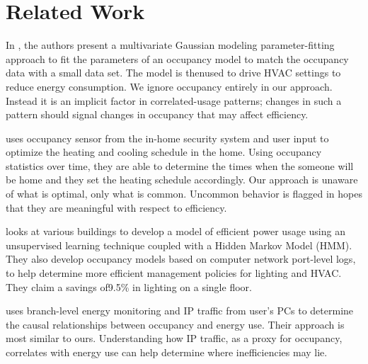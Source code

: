 \section{Related Work}

In \cite{occmodels_buildsys11}, the authors present a multivariate Gaussian modeling parameter-fitting 
approach to fit the parameters of an occupancy model to match the occupancy data with a small data set.  
The model is thenused to drive HVAC settings to reduce energy consumption.  We ignore occupancy entirely 
in our approach.  Instead it is an implicit factor in correlated-usage patterns; changes in such a pattern 
should signal changes in occupancy that may affect efficiency.

\cite{kaminthermo} uses occupancy sensor from the in-home security system and user input to
optimize the heating and cooling schedule in the home.  Using occupancy statistics over time, they
are able to determine the times when the someone will be home and they set the heating schedule accordingly.
Our approach is unaware of what is optimal, only what is common.  Uncommon behavior is flagged in hopes
that they are meaningful with respect to efficiency.

\cite{Bellala_buildsys11} looks at various buildings to develop a model of efficient power usage using 
an unsupervised learning technique coupled with a Hidden Markov Model (HMM).  They also develop occupancy models based on
computer network port-level logs, to help determine more efficient management policies for lighting and HVAC.  
They claim a savings of9.5\% in lighting on a single floor.

\cite{kim:buildsys2010} uses branch-level energy monitoring and IP traffic from user's PCs to determine the
causal relationships between occupancy and energy use.  Their approach is most similar to ours.  Understanding how IP 
traffic, as a proxy for occupancy, correlates with energy use can help determine where inefficiencies may lie.



